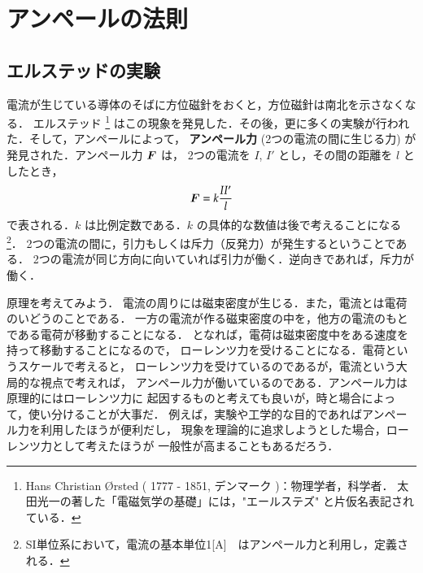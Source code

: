     \section{アンペールの法則}
    \subsection{エルステッドの実験}
        電流が生じている導体のそばに方位磁針をおくと，方位磁針は南北を示さなくなる．
        エルステッド
            \footnote{
                Hans Christian \O rsted ( 1777 - 1851, デンマーク  )：物理学者，科学者．
                太田光一の著した「電磁気学の基礎\I」には，"エールステズ" と片仮名表記されている．
            }
        はこの現象を発見した．その後，更に多くの実験が行われた．そして，アンペールによって，
        \textbf{アンペール力} (2つの電流の間に生じる力) が発見された．アンペール力 $\boldsymbol{F}$ は，
        2つの電流を $I$, $I'$ とし，その間の距離を $l$ としたとき，
            \begin{align}
                \boldsymbol{F} = k\frac{II'}{l}
            \end{align}
        で表される．$k$ は比例定数である．$k$ の具体的な数値は後で考えることになる
            \footnote{
                SI単位系において，電流の基本単位1[A]　はアンペール力と利用し，定義される．
            }．
        2つの電流の間に，引力もしくは斥力（反発力）が発生するということである．
        2つの電流が同じ方向に向いていれば引力が働く．逆向きであれば，斥力が働く．

        原理を考えてみよう．
        電流の周りには磁束密度が生じる．また，電流とは電荷のいどうのことである．
        一方の電流が作る磁束密度の中を，他方の電流のもとである電荷が移動することになる．
        となれば，電荷は磁束密度中をある速度を持って移動することになるので，
        ローレンツ力を受けることになる．電荷というスケールで考えると，
        ローレンツ力を受けているのであるが，電流という大局的な視点で考えれば，
        アンペール力が働いているのである．アンペール力は原理的にはローレンツ力に
        起因するものと考えても良いが，時と場合によって，使い分けることが大事だ．
        例えば，実験や工学的な目的であればアンペール力を利用したほうが便利だし，
        現象を理論的に追求しようとした場合，ローレンツ力として考えたほうが
        一般性が高まることもあるだろう．

